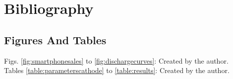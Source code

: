 \documentclass[12pt, a4paper]{article}
\begin{document}


% 

\newpage

\tableofcontents

\newpage

\newpage

\newpage

\newpage

\newpage

\newpage

\newpage

\newpage

\newpage

\section{Bibliography}
\printbibliography

\subsection{Figures And Tables}
Figs. \ref{fig:smartphonesales} to \ref{fig:dischargecurves}: Created by the author.\\
Tables \ref{table:parameterscathode} to \ref{table:results}: Created by the author.
\end{document}
